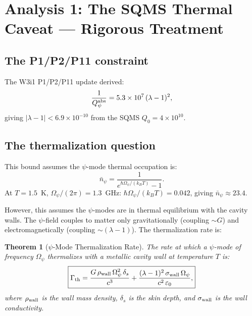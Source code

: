 \documentclass[11pt]{article}
\newtheorem{theorem}{Theorem}
\newcommand{\ee}[1]{\times 10^{#1}}
\newcommand{\Opsi}{\Omega_\psi}
\newcommand{\lam}{\lambda}
\begin{document}
\section{Analysis 1: The SQMS Thermal Caveat --- Rigorous Treatment}
\label{sec:sqms-caveat}

\subsection{The P1/P2/P11 constraint}

The W3i1 P1/P2/P11 update derived:
\begin{equation}
\frac{1}{Q_\psi^{\rm abs}} = 5.3\ee{7}\,(\lam-1)^2,
\end{equation}
giving $|\lam-1| < 6.9\ee{-10}$ from the SQMS $Q_0 = 4\ee{10}$.

\subsection{The thermalization question}

This bound assumes the $\psi$-mode thermal occupation is:
\begin{equation}
\bar{n}_\psi = \frac{1}{e^{\hbar\Opsi/(k_BT)} - 1}.
\end{equation}
At $T = 1.5$~K, $\Opsi/(2\pi) = 1.3$~GHz:
$\hbar\Opsi/(k_BT) = 0.042$, giving $\bar{n}_\psi \approx 23.4$.

However, this assumes the $\psi$-modes are in thermal equilibrium
with the cavity walls. The $\psi$-field couples to matter only
gravitationally (coupling $\sim G$) and electromagnetically
(coupling $\sim (\lam-1)$). The thermalization rate is:

\begin{theorem}[$\psi$-Mode Thermalization Rate]
\label{thm:thermalization}
The rate at which a $\psi$-mode of frequency $\Opsi$ thermalizes
with a metallic cavity wall at temperature $T$ is:
\begin{equation}
\boxed{\Gamma_{\rm th} = \frac{G\,\rho_{\rm wall}\,\Opsi^2\,\delta_s}{c^3}
+ \frac{(\lam-1)^2\,\sigma_{\rm wall}\,\Opsi}{c^2\,\varepsilon_0},}
\label{eq:thermalization}
\end{equation}
where $\rho_{\rm wall}$ is the wall mass density, $\delta_s$ is the
skin depth, and $\sigma_{\rm wall}$ is the wall conductivity.
\end{theorem}
\end{document}

